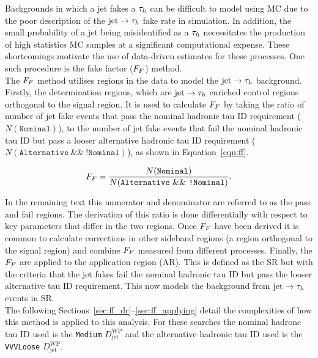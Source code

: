 Backgrounds in which a jet fakes a $\tau_{h}$ can be difficult to model using MC due to the poor description of the $\text{jet}\rightarrow\tau_{h}$ fake rate in simulation. 
In addition, the small probability of a jet being misidentified as a $\tau_{h}$ necessitates the production of high statistics MC samples at a significant computational expense.
These shortcomings motivate the use of data-driven estimates for these processes. 
One such procedure is the fake factor ($F_{F}$) method. \\

The $F_{F}$ method utilises regions in the data to model the $\text{jet}\rightarrow\tau_{h}$ background. 
Firstly, the determination regions, which are $\text{jet}\rightarrow\tau_{h}$ enriched control regions orthogonal to the signal region. 
It is used to calculate $F_{F}$ by taking the ratio of number of jet fake events that pass the nominal hadronic tau ID requirement ($N(\texttt{Nominal})$), to the number of jet fake events that fail the nominal hadronic tau ID but pass a looser alternative hadronic tau ID requirement ($N(\texttt{Alternative}~\&\&~\texttt{!Nominal})$), as shown in Equation~\ref{eqn:ff}.

\begin{equation}
F_{F} = \frac{N(\texttt{Nominal})}{N(\texttt{Alternative}~\&\&~\texttt{!Nominal})}.
\label{eqn:ff}
\end{equation}

In the remaining text this numerator and denominator are referred to as the pass and fail regions.
The derivation of this ratio is done differentially with respect to key parameters that differ in the two regions.
Once $F_{F}$ have been derived it is common to calculate corrections in other sideband regions (a region orthogonal to the signal region) and combine $F_{F}$ measured from different processes.
Finally, the $F_{F}$ are applied to the application region (AR). 
This is defined as the SR but with the criteria that the jet fakes fail the nominal hadronic tau ID but pass the looser alternative tau ID requirement.
This now models the background from $\text{jet}\rightarrow\tau_{h}$ events in SR. \\

The following Sections~\ref{sec:ff_dr}--\ref{sec:ff_applying} detail the complexities of how this method is applied to this analysis.
For these searches the nominal hadronc tau ID used is the \texttt{Medium} $D_{\text{jet}}^{\text{WP}}$ and the alternative hadronic tau ID used is the \texttt{VVVLoose}  $D_{\text{jet}}^{\text{WP}}$.

